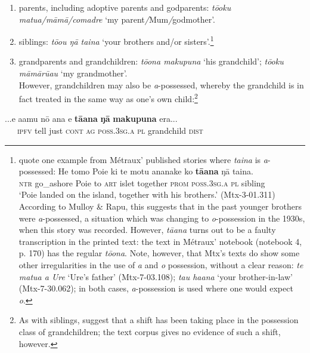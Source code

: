 \begin{enumerate}
\item 
parents, including adoptive parents and godparents: \textit{tō{\ꞌ}oku matu{\ꞌ}a/māmā/comadre} ‘my parent\textit{/}Mum\textit{/}godmother’.

\item 
siblings: \textit{tō{\ꞌ}ou ŋā taina} ‘your brothers and/or sisters’.\footnote{\label{fn:297}\citet[22]{MulloyRapu1977} quote one example from Métraux’ published stories where \textit{taina} is \textit{a}{}-possessed:
\ea
\gll  He tomo Poie ki te motu ananake ko \textbf{tā{\ꞌ}ana} ŋā taina.\\
  \textsc{ntr} go\_ashore Poie to \textsc{art} islet together \textsc{prom} \textsc{poss.3sg.a} \textsc{pl} sibling \\
  \glt 
  ‘Poie landed on the island, together with his brothers.’ (Mtx-3-01.311) \z
According to Mulloy \& Rapu, this suggests that in the past younger brothers were \textit{a}{}-possessed, a situation which was changing to \textit{o}{}-possession in the 1930s, when this story was recorded. However, \textit{tā{\ꞌ}ana} turns out to be a faulty transcription in the printed text: the text in Métraux’ notebook (notebook 4, p. 170) has the regular \textit{tō{\ꞌ}ona}. 
Note, however, that Mtx’s texts do show some other irregularities in the use of \textit{{\ꞌ}a} and \textit{o} possession, without a clear reason: \textit{te matu{\ꞌ}a {\ꞌ}a Ure} ‘Ure’s father’ (Mtx-7-03.108); \textit{ta{\ꞌ}u ha{\ꞌ}ana} ‘your brother-in-law’ (Mtx-7-30.062); in both cases, \textit{a}{}-possession is used where one would expect \textit{o}.}

\item 
grandparents and grandchildren: \textit{tō{\ꞌ}ona makupuna} ‘his grandchild’; \textit{tō{\ꞌ}oku māmā\-rū{\ꞌ}au} ‘my grandmother’.\\
However, grandchildren may also be \textit{a}{}-possessed, whereby the grandchild is in fact treated in the same way as one’s own child:\footnote{\label{fn:298}As with siblings, \citet[22]{MulloyRapu1977} suggest that a shift has been taking place in the possession class of grandchildren; the text corpus gives no evidence of such a shift, however.}

\end{enumerate}

\ea\label{ex:6.60}
\gll ...e {\ꞌ}a{\ꞌ}amu nō {\ꞌ}ana e \textbf{tā{\ꞌ}ana} \textbf{ŋā} \textbf{makupuna} era... \\
~~~\textsc{ipfv} tell just \textsc{cont} \textsc{ag} \textsc{poss.3sg.a}\textsc{} \textsc{pl} grandchild \textsc{dist} \\

